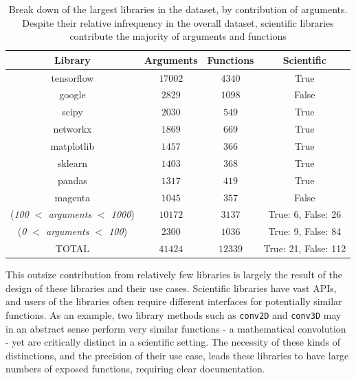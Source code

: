 \begin{table}[h!]
    \begin{center}
    \begin{tabular}{c | c | c | c}
        Library      & Arguments     & Functions  & Scientific \\
        \hline
        tensorflow   & $ 17002 $     & $ 4340 $ & True \\
        google   & $ 2829 $      & $ 1098 $ & False \\
        scipy    & $ 2030 $      & $ 549 $ & True \\
        networkx     & $ 1869 $      & $ 669 $ & True \\
        matplotlib   & $ 1457 $      & $ 366 $ & True \\
        sklearn      & $ 1403 $      & $ 368 $ & True \\
        pandas   & $ 1317 $      & $ 419 $ & True \\
        magenta      & $ 1045 $      & $ 357 $ & False \\
        (\textit{100 $<$ arguments $<$ 1000})   & $ 10172 $     & $ 3137 $ & True: 6, False: 26 \\
        (\textit{0 $<$ arguments $<$ 100})      & $ 2300 $      & $ 1036 $ & True: 9, False: 84 \\
        \hline
        \hline
        TOTAL    & $ 41424 $     & $ 12339 $ & True: 21, False: 112 \\
    \end{tabular}
    \caption {Break down of the largest libraries in the dataset, by contribution of arguments. Despite their relative infrequency in the overall dataset, scientific libraries contribute the majority of arguments and functions}
    \label{table:breakdown_by_library}
    \end{center}
\end{table}



This outsize contribution from relatively few libraries is largely the result of the design of these libraries and their use cases. 
Scientific libraries have vast APIs, and users of the libraries often require different interfaces for potentially similar functions. 
As an example, two library methods such as \texttt{conv2D} and \texttt{conv3D} may in an abstract sense perform very similar functions - a mathematical convolution - yet are critically distinct in a scientific setting.
The necessity of these kinds of distinctions, and the precision of their use case, leads these libraries to have large numbers of exposed functions, requiring clear documentation.

